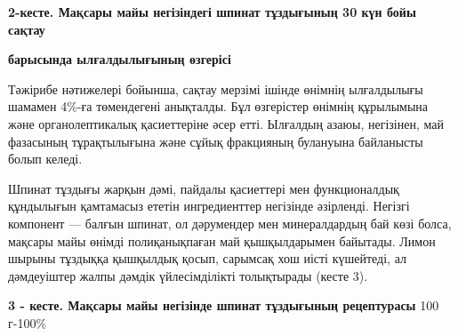 {{\bfseries 2-кесте. Мақсары майы негізіндегі шпинат тұздығының 30 күн бойы
сақтау}

{\bfseries барысында ылғалдылығының өзгерісі}


Тәжірибе нәтижелері бойынша, сақтау мерзімі ішінде өнімнің ылғалдылығы
шамамен 4\%-ға төмендегені анықталды. Бұл өзгерістер өнімнің құрылымына
және органолептикалық қасиеттеріне әсер етті. Ылғалдың азаюы, негізінен,
май фазасының тұрақтылығына және сұйық фракцияның булануына байланысты
болып келеді.

Шпинат тұздығы жарқын дәмі, пайдалы қасиеттері мен функционалдық
құндылығын қамтамасыз ететін ингредиенттер негізінде әзірленді. Негізгі
компонент --- балғын шпинат, ол дәрумендер мен минералдардың бай көзі
болса, мақсары майы өнімді полиқанықпаған май қышқылдарымен байытады.
Лимон шырыны тұздыққа қышқылдық қосып, сарымсақ хош иісті күшейтеді, ал
дәмдеуіштер жалпы дәмдік үйлесімділікті толықтырады (кесте 3).

{\bfseries 3 - кесте. Мақсары майы негізінде шпинат тұздығының рецептурасы}
100 г-100\%

}
